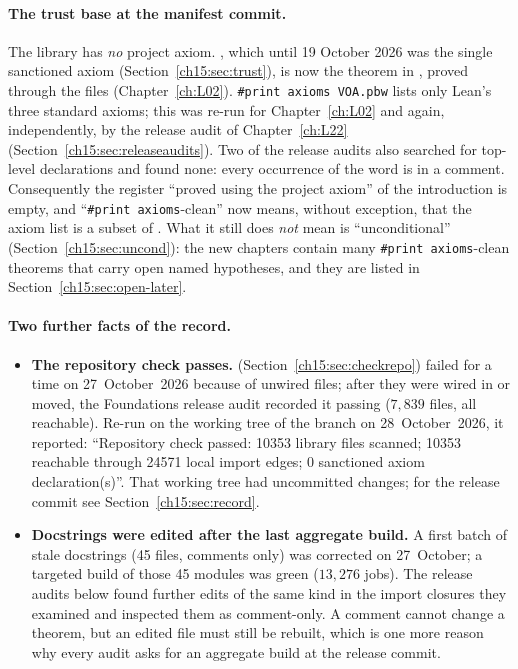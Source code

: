 \paragraph{The trust base at the manifest commit.} The library has \emph{no} project axiom. , which until
19 October 2026 was the single sanctioned axiom (Section~\ref{ch15:sec:trust}), is now the theorem
 in , proved through the files
 (Chapter~\ref{ch:L02}). \texttt{\#print axioms VOA.pbw} lists only Lean's three
standard axioms; this was re-run for Chapter~\ref{ch:L02} and again, independently, by the release audit of
Chapter~\ref{ch:L22} (Section~\ref{ch15:sec:releaseaudits}). Two of the release audits also searched  for
top-level  declarations and found none: every occurrence of the word is in a comment. Consequently the
register ``proved using the project axiom'' of the introduction is empty, and ``\texttt{\#print axioms}-clean'' now means,
without exception, that the axiom list is a subset of . What it still does
\emph{not} mean is ``unconditional'' (Section~\ref{ch15:sec:uncond}): the new chapters contain many
\texttt{\#print axioms}-clean theorems that carry open named hypotheses, and they are listed in
Section~\ref{ch15:sec:open-later}.

\paragraph{Two further facts of the record.}
\begin{itemize}
\item \textbf{The repository check passes.}  (Section~\ref{ch15:sec:checkrepo})
  failed for a time on 27~October~2026 because of unwired files; after they were wired in or moved, the Foundations
  release audit recorded it passing ($7{,}839$ files, all reachable). Re-run on the working tree of the branch
   on 28~October~2026, it reported: ``Repository check passed: 10353 library files scanned; 10353
  reachable through 24571 local import edges; 0 sanctioned axiom declaration(s)''. That working tree had uncommitted
  changes; for the release commit see Section~\ref{ch15:sec:record}.
\item \textbf{Docstrings were edited after the last aggregate build.} A first batch of stale docstrings (45 files,
  comments only) was corrected on 27~October; a targeted build of those 45 modules was green ($13{,}276$ jobs). The
  release audits below found further edits of the same kind in the import closures they examined and inspected them as
  comment-only. A comment cannot change a theorem, but an edited file must still be rebuilt, which is one more reason
  why every audit asks for an aggregate build at the release commit.
\end{itemize}

